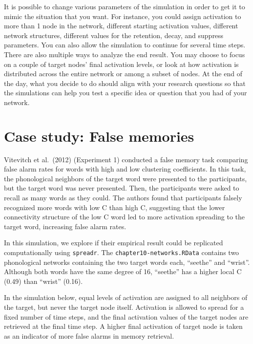 \documentclass[
]{book}
\begin{document}
It is possible to change various parameters of the simulation in order to get it to mimic the situation that you want. For instance, you could assign activation to more than 1 node in the network, different starting activation values, different network structures, different values for the retention, decay, and suppress parameters. You can also allow the simulation to continue for several time steps. There are also multiple ways to analyze the end result. You may choose to focus on a couple of target nodes' final activation levels, or look at how activation is distributed across the entire network or among a subset of nodes. At the end of the day, what you decide to do should align with your research questions so that the simulations can help you test a specific idea or question that you had of your network.

\section{Case study: False memories}\label{case-study-false-memories}

Vitevitch et al.~(2012) (Experiment 1) conducted a false memory task comparing false alarm rates for words with high and low clustering coefficients. In this task, the phonological neighbors of the target word were presented to the participants, but the target word was never presented. Then, the participants were asked to recall as many words as they could. The authors found that participants falsely recognized more words with low C than high C, suggesting that the lower connectivity structure of the low C word led to more activation spreading to the target word, increasing false alarm rates.

In this simulation, we explore if their empirical result could be replicated computationally using \texttt{spreadr}. The \texttt{chapter10-networks.RData} contains two phonological networks containing the two target words each, ``seethe'' and ``wrist''. Although both words have the same degree of 16, ``seethe'' has a higher local C (0.49) than ``wrist'' (0.16).

In the simulation below, equal levels of activation are assigned to all neighbors of the target, but never the target node itself. Activation is allowed to spread for a fixed number of time steps, and the final activation values of the target nodes are retrieved at the final time step. A higher final activation of target node is taken as an indicator of more false alarms in memory retrieval.
\end{document}
